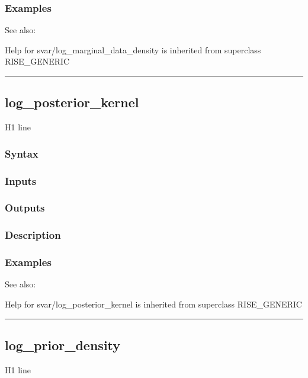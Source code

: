 \documentclass[letterpaper,10pt,english]{sphinxmanual}
\begin{document}
\subsubsection{Examples}
\label{classes/models/@svar/svar:id55}
See also:

Help for svar/log\_marginal\_data\_density is inherited from superclass RISE\_GENERIC


\bigskip\hrule{}\bigskip



\subsection{log\_posterior\_kernel}
\label{classes/models/@svar/svar:log-posterior-kernel}\label{classes/models/@svar/svar:id56}
H1 line


\subsubsection{Syntax}
\label{classes/models/@svar/svar:id57}

\subsubsection{Inputs}
\label{classes/models/@svar/svar:id58}

\subsubsection{Outputs}
\label{classes/models/@svar/svar:id59}

\subsubsection{Description}
\label{classes/models/@svar/svar:id60}

\subsubsection{Examples}
\label{classes/models/@svar/svar:id61}
See also:

Help for svar/log\_posterior\_kernel is inherited from superclass RISE\_GENERIC


\bigskip\hrule{}\bigskip



\subsection{log\_prior\_density}
\label{classes/models/@svar/svar:id62}\label{classes/models/@svar/svar:log-prior-density}
H1 line
\end{document}
